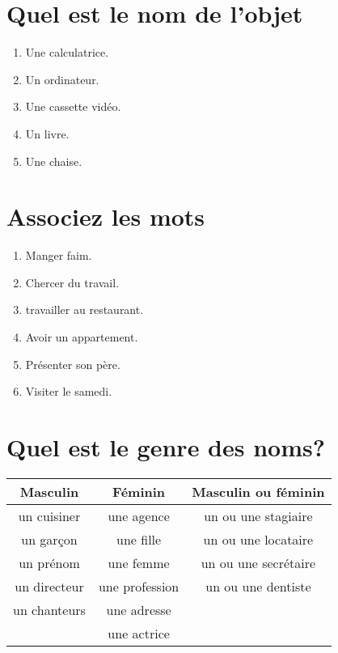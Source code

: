 \section{Quel est le nom de l'objet}

\begin{enumerate}
    \item Une calculatrice.
    \item Un ordinateur.
    \item Une cassette vidéo.
    \item Un livre.
    \item Une chaise.
\end{enumerate}

\section{Associez les mots}

\begin{enumerate}
    \item Manger \rar faim.
    \item Chercer \rar  du travail.
    \item travailler \rar au restaurant.
    \item Avoir \rar un appartement.
    \item Présenter \rar son père.
    \item Visiter \rar le samedi.
\end{enumerate}

\section{Quel est le genre des noms?}

\begin{table}[H]
    \centering
    \begin{tabular}{|c|c|c|}
        \hline
        \textbf{Masculin} & \textbf{Féminin} & \textbf{Masculin ou féminin} \\
        \hline
        un cuisiner & une agence & un ou une stagiaire \\
        un garçon & une fille & un ou une locataire \\ 
        un prénom & une femme & un ou une secrétaire \\
        un directeur & une profession & un ou une dentiste \\
        un chanteurs & une adresse & \\
        & une actrice & \\
        \hline
    \end{tabular}
\end{table}

